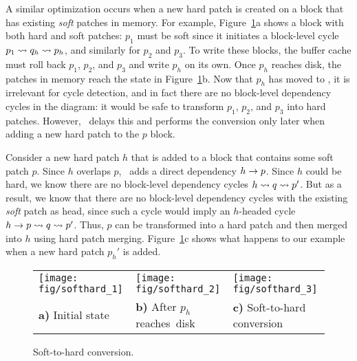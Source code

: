 A similar optimization occurs when a new hard patch is created on a block
that has existing \emph{soft} patches in memory.
%
For example, Figure~\ref{f:soft2hard}a shows a block with both hard and
soft patches: $p_1$ must be soft since it initiates a block-level cycle
$p_1 \leadsto q_h \leadsto p_h$, and similarly for $p_2$ and $p_3$.
%
To write these blocks, the buffer cache must roll back $p_1$, $p_2$, and
$p_3$ and write $p_h$ on its own.
%
Once $p_h$ reaches disk, the patches in memory reach the state in
Figure~\ref{f:soft2hard}b.
%
Now that $p_h$ has moved to \PDisk, it is irrelevant for cycle detection,
and in fact there are no block-level dependency cycles in the diagram: it
would be safe to transform $p_1$, $p_2$, and $p_3$ into hard patches.
%
However, \Kudos\ delays this and performs the conversion only later when
adding a new hard patch to the $p$ block. 


Consider a new hard patch $h$ that is added to a block that contains some
soft patch $p$.
%
Since $h$ overlaps $p$, \Kudos\ adds a direct dependency $h \rightarrow p$.
%
Since $h$ could be hard, we know there are no block-level dependency cycles
$h \leadsto q \leadsto p'$.
%
But as a result, we know that there are no block-level dependency cycles
with the existing \emph{soft} patch as head, since such a cycle would imply
an $h$-headed cycle $h \rightarrow p \leadsto q \leadsto p'$.
%
Thus, $p$ can be transformed into a hard patch and then merged into $h$
using hard patch merging.
%
Figure~\ref{f:soft2hard}c shows what happens to our example when a new hard
patch $p_h'$ is added.


\begin{figure}
\centering
\begin{small}
\begin{tabular}{@{}p{.32\hsize}@{~~}p{.32\hsize}@{~~}p{.32\hsize}@{}}
\texttt{[image: fig/softhard\_1]} &
\texttt{[image: fig/softhard\_2]} &
\texttt{[image: fig/softhard\_3]} \\
\centering \textbf{a)} Initial state &
\centering \textbf{b)} After $p_h$ reaches~disk &
\centering \textbf{c)} Soft-to-hard conversion
\end{tabular}
\end{small}
\caption{Soft-to-hard conversion.}
\label{f:soft2hard}
\end{figure}



